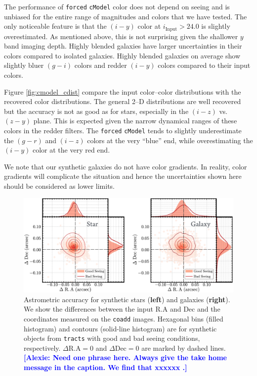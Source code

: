 \documentclass[useamsfonts]{pasj01}
\newcommand{\alexie}[1]{\textcolor{blue}{\textbf{[Alexie: #1]}}}
\def\cmodel{\texttt{cModel}}
\def\forced{\texttt{forced}}
\def\coadd{\texttt{coadd}}
\def\tracts{\texttt{tracts}}
\begin{document}
    The performance of \forced{} \cmodel{} color does not depend on seeing and is 
    unbiased for the entire range of magnitudes and colors that we have tested.
    The only noticeable feature is that the $(i-y)$ color at $i_{\mathrm{Input}}>24.0$ 
    is slightly overestimated.
    As mentioned above, this is not surprising given the shallower $y$ band imaging depth. Highly blended galaxies have larger uncertainties in their colors compared to isolated galaxies.  Highly blended galaxies on average show slightly bluer $(g-i)$ colors and redder  
    $(i-y)$ colors compared to their input colors.

Figure  \ref{fig:cmodel_cdist} compare the input color--color distributions with the recovered color distributions. The general 2--D distributions are well recovered but the accuracy is not as good as for stars, especially in the $(i-z)$ vs. $(z-y)$ plane.
    This is expected given the narrow dynamical ranges of these colors in the redder filters.
    The \forced{} \cmodel{} tends to slightly underestimate the $(g-r)$ and $(i-z)$
    colors at the very ``blue'' end, while overestimating the $(i-y)$ color at the very
    red end.

We note that  our synthetic galaxies do not have color gradients.  In reality, color gradients will complicate the situation and hence the uncertainties shown here should be considered as lower limits.
    


\begin{figure}
    \begin{center}
        \includegraphics[width=\textwidth]{fig/synpipe_astrometry}
    \end{center}
    \caption{
        Astrometric accuracy for synthetic stars (\textbf{left}) and galaxies
        (\textbf{right}). We show the differences between the input R.A and Dec and the coordinates measured on the \coadd{} images. Hexagonal bins (filled histogram) and contours (solid-line histogram) are for synthetic objects from \tracts{} with good and bad seeing conditions, 
        respectively.
        $\Delta\mathrm{R.A}=0$ and $\Delta\mathrm{Dec}=0$ are marked by dashed lines. \alexie{Need one phrase here. Always give the take home message in the caption. We find that xxxxxx .}
        }
    \label{fig:astrometry}
\end{figure}
\end{document}
